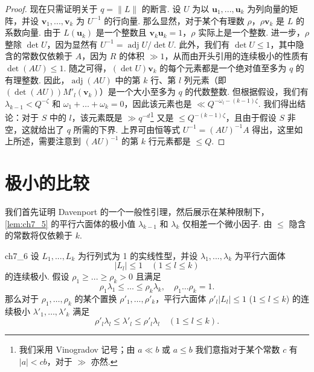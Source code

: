 \begin{proof}
现在只需证明关于 $q = \|L\|$ 的断言. 设 $U$ 为以 $\mathbf{u}_1, ..., \mathbf{u}_k$ 为列向量的矩阵，并设 $\mathbf{v}_1, ..., \mathbf{v}_k$ 为 $U^{-1}$ 的行向量. 那么显然，对于某个有理数 $\rho$，$\rho \mathbf{v}_k$ 是 $L$ 的系数向量. 由于 $L(\mathbf{u}_k)$ 是一个整数且 $\mathbf{v}_k \mathbf{u}_k = 1$，$\rho$ 实际上是一个整数. 进一步，$\rho$ 整除 $\det U$，因为显然有 $U^{-1} = \operatorname{adj} U/\operatorname{det} U$. 此外，我们有 $\det U \leq 1$，其中隐含的常数仅依赖于 $A$，因为 $R$ 的体积 $\gg 1$，从而由开头引用的连续极小的性质有 $\det(AU) \leqslant 1$. 随之可得，$(\det U) \mathbf{v}_k$ 的每个元素都是一个绝对值至多为 $q$ 的有理整数. 因此，$\operatorname{adj} (AU)$ 中的第 $k$ 行、第 $l$ 列元素（即 $(\det(AU)) M'_{l}(\mathbf{v}_{k})$）是一个大小至多为 $q$ 的代数整数. 但根据假设，我们有 $\lambda_{k-1} < Q^{-\zeta}$ 和 $\omega_1 + \ldots + \omega_k = 0$，因此该元素也是 $\ll Q^{-\omega_l-(k-1)\zeta}$. 我们得出结论：对于 $S$ 中的 $l$，该元素既是 $\gg q^{-d}$\footnote{我们采用 Vinogradov 记号；由 $a \ll b$ 或 $a \leqslant b$ 我们意指对于某个常数 $c$ 有 $|a| < cb$，对于 $\gg$ 亦然.} 又是 $\leqslant Q^{-(k-1)\zeta}$，且由于假设 $S$ 非空，这就给出了 $q$ 所需的下界. 上界可由恒等式 $U^{-1} = (AU)^{-1} A$ 得出，这里如上所述，需要注意到 $(AU)^{-1}$ 的第 $k$ 行元素都是 $\leqslant Q$.
\end{proof}

\section{极小的比较}\label{sec:ch7_8}

我们首先证明 Davenport 的一个一般性引理，然后展示在某种限制下，\autoref{lem:ch7_5} 的平行六面体的极小值 $\lambda_{k-1}$ 和 $\lambda_k$ 仅相差一个微小因子. 由 $\leqslant$ 隐含的常数将仅依赖于 $k$.

\begin{mylemma}{}{ch7_6}
设 $L_1, ..., L_k$ 为行列式为 1 的实线性型，并设 $\lambda_1, ..., \lambda_k$ 为平行六面体
\[|L_l| \leqslant 1 \quad (1 \leqslant l \leqslant k)\]
的连续极小. 假设 $\rho_1 \ge ... \ge \rho_k > 0$ 且满足
\[\rho_1 \lambda_1 \leqslant \ldots \leqslant \rho_k \lambda_k, \quad \rho_1 \ldots \rho_k = 1.\]
那么对于 $\rho_1, \dots, \rho_k$ 的某个置换 $\rho'_1, \ldots, \rho'_k$，平行六面体 $\rho'_l | L_l | \leq 1$ ($1 \leq l \leq k$) 的连续极小 $\lambda'_1, \ldots, \lambda'_k$ 满足
\[\rho'_l \lambda_l \leqslant \lambda'_l \leqslant \rho'_l \lambda_l \quad (1 \leqslant l \leqslant k).\]
\end{mylemma}

